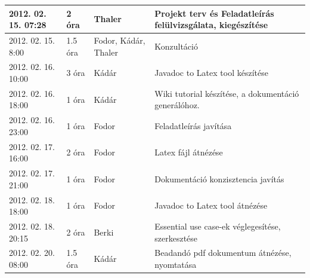 \begin{center}
\begin{tabular}{| l | p{1.9cm} | p{2.6cm} | p{6.1cm} |}
2012. 02. 15. 07:28 & 2 óra & Thaler & Projekt terv és Feladatleírás felülvizsgálata, kiegészítése\\ \hline
2012. 02. 15. 8:00 & 1.5 óra & Fodor, Kádár, Thaler & Konzultáció\\ \hline
2012. 02. 16. 10:00 & 3 óra & Kádár & Javadoc to Latex tool készítése\\ \hline
2012. 02. 16. 18:00 & 1 óra & Kádár & Wiki tutorial készítése, a dokumentáció generálóhoz.\\ \hline
2012. 02. 16. 23:00 & 1 óra & Fodor & Feladatleírás javítása\\ \hline
2012. 02. 17. 16:00 & 2 óra & Fodor & Latex fájl átnézése\\ \hline
2012. 02. 17. 21:00 & 1 óra & Fodor & Dokumentáció konzisztencia javítás\\ \hline
2012. 02. 18. 18:00 & 1 óra & Fodor & Javadoc to Latex tool átnézése\\ \hline
2012. 02. 18. 20:15 & 2 óra & Berki & Essential use case-ek véglegesítése, szerkesztése\\ \hline
2012. 02. 20. 08:00 & 1.5 óra & Kádár & Beadandó pdf dokumentum átnézése, nyomtatása\\ \hline

            \hline
        \end{tabular}
    \end{center}


